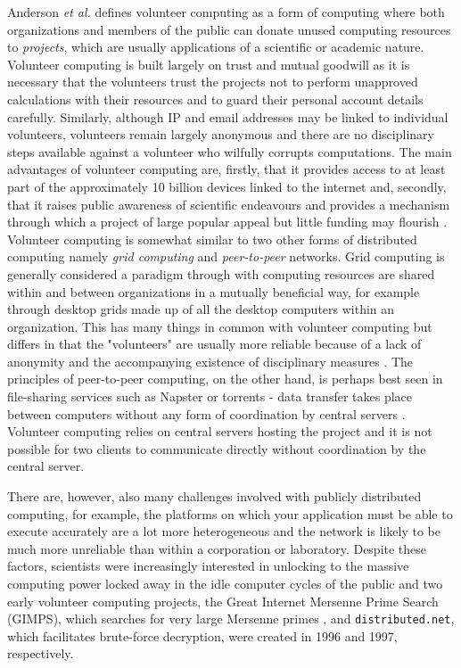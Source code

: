 Anderson \emph{et al.} \cite{boincwiki} defines volunteer computing as a form of computing where both organizations and members of the public can donate unused computing resources to \emph{projects}, which are usually applications of a scientific or academic nature. Volunteer computing is built largely on trust and mutual goodwill as it is necessary that the volunteers trust the projects not to perform unapproved calculations with their resources and to guard their personal account details carefully. Similarly, although IP and email addresses may be linked to individual volunteers, volunteers remain largely anonymous and there are no disciplinary steps available against a volunteer who wilfully corrupts computations. The main advantages of volunteer computing are, firstly, that it provides access to at least part of the approximately 10 billion devices linked to the internet \cite{cisco, anderson2013} and, secondly, that it raises public awareness of scientific endeavours and provides a mechanism through which a project of large popular appeal but little funding may flourish \cite{boincwiki}.
Volunteer computing is somewhat similar to two other forms of distributed computing namely \emph{grid computing} and \emph{peer-to-peer} networks. Grid computing is generally considered a paradigm through with computing resources are shared within and between organizations in a mutually beneficial way, for example through desktop grids made up of  all the desktop computers within an organization. This has many things in common with volunteer computing but differs in that the "volunteers" are usually more reliable because of a lack of anonymity and the accompanying existence of disciplinary measures \cite{boincwiki, fostergrid}. The principles of peer-to-peer computing, on the other hand, is  perhaps best seen in file-sharing services such as Napster or torrents - data transfer takes place between computers without any form of coordination by central servers \cite{peer, peer2}. Volunteer computing relies on central servers hosting the project and it is not possible for two clients to communicate directly without coordination by the central server. 
 

There are, however, also many challenges involved with publicly distributed computing, for example, the platforms on which your application must be able to execute accurately are a lot more heterogeneous  and the network is likely to be much more unreliable than within a corporation or laboratory.   Despite these factors, scientists were increasingly interested in unlocking to the massive computing power locked away in the idle computer cycles of the public and two early volunteer computing projects, the Great Internet Mersenne Prime Search (GIMPS), which searches for very large Mersenne primes \cite{gimps}, and \texttt{distributed.net}, which facilitates brute-force decryption, were created in 1996 and 1997, respectively. 

